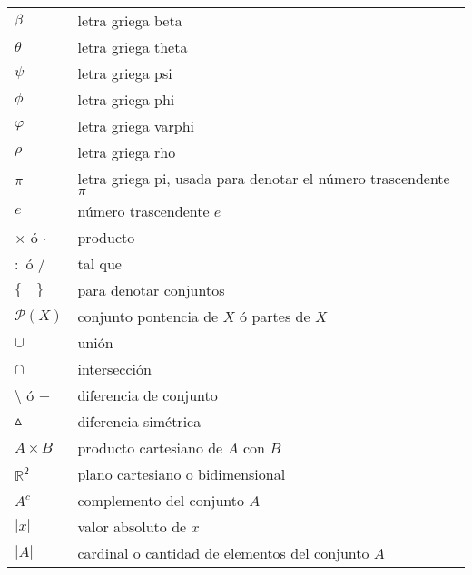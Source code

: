 \begin{longtable}{p{2cm}p{9cm}}
$\beta$ & letra griega beta \\
$\theta$ & letra griega theta \\
$\psi$ & letra griega psi \\
$\phi$ & letra griega phi \\
$\varphi$ & letra griega varphi \\
$\rho$ & letra griega rho \\
$\pi$ & letra griega pi, usada para denotar el número trascendente $\pi$ \\
$e$ & número trascendente $e$ \\
$\times$ ó $\cdot$ & producto \\
$:$ ó $/$ & tal que \\
$\{\quad\}$ & para denotar conjuntos \\
$\mathcal{P}(X)$ & conjunto pontencia de $X$ ó partes de $X$ \\ 
$\cup$ & unión \\
$\cap$ & intersección \\
$\setminus$ ó $-$ & diferencia de conjunto \\
$\vartriangle$ & diferencia simétrica \\
$A\times B$ & producto cartesiano de $A$ con $B$ \\
$\mathbb{R}^2$ & plano cartesiano o bidimensional \\
$A^c$ & complemento del conjunto $A$ \\
$|x|$ & valor absoluto de $x$ \\
$|A|$ & cardinal o cantidad de elementos del conjunto $A$ \\
\end{longtable}
%




